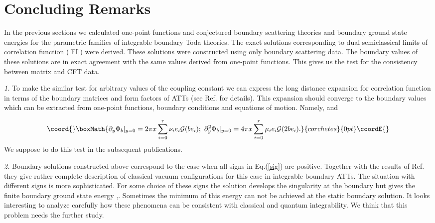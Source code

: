 \documentclass[a4paper,12pt,titlepage,final]{article}
\begin{document}
\section{Concluding Remarks}

In the previous sections we calculated one-point functions and conjectured
boundary scattering theories and boundary ground state energies for the
parametric families of integrable boundary Toda theories. The exact
solutions corresponding to dual semiclassical limits of correlation function
(\ref{FI}) were derived. These solutions were constructed using only
boundary scattering data. The boundary values of these solutions are in
exact agreement with the same values derived from one-point functions. This
gives us the test for the consistency between \coordHE{}matrix and CFT data.

\textit{1.\/} To make the similar test for arbitrary values of the coupling
constant we can express the long distance expansion for correlation
function
\coordHE{} in terms of the boundary \coordHE{}matrices \coordHE{} and form
factors of ATTs (see Ref.\cite{DPW} for details). This expansion should
converge to the boundary values which can be extracted from one-point
functions, boundary conditions and equations of motion. Namely, \coordHE{} and

\[\coord{}\boxMath{
\partial _{y}\Phi _{b}|_{y=0}=2\pi x\sum_{i=0}^{r}\nu _{i}e_{i}\mathcal{G}
(be_{i});~\partial _{y}^{2}\Phi _{b}|_{y=0}=
4\pi x\sum_{i=0}^{r}\mu_{i}e_{i}
\mathcal{G}(2be_{i}).
}{corchetes}{0pt}\coordE{}\]
We suppose to do this test in the subsequent publications.

\textit{2.\/} Boundary solutions constructed above correspond to the case when
all signs \coordHE{} in Eq.(\ref{sig}) are positive. Together with
the results of Ref.\cite{FO} they give rather complete description of
classical vacuum configurations for this case in integrable boundary ATTs.
The situation with different signs \coordHE{} is more sophisticated.
For some choice of these signs the solution develops the singularity at the
boundary but gives the finite boundary ground state energy \cite{BOWC},\cite
{BPR}. Sometimes the minimum of this energy can not be achieved at the
static boundary solution. It looks interesting to analyze carefully how
these phenomena can be consistent with classical and quantum 
integrability. We
think that this problem needs the further study.
\end{document}
